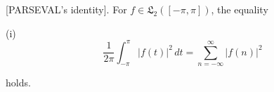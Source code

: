 [PARSEVAL's identity]. For $f \in \mathfrak{L}_2([-\pi, \pi])$, the equality

(i) $$\frac{1}{2\pi} \int_{-\pi}^{\pi} |f(t)|^2 \, dt = \sum_{n=-\infty}^{\infty} |f(n)|^2$$

holds.